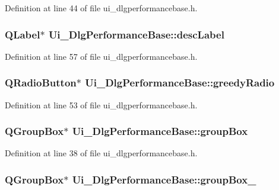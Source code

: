 Definition at line 44 of file ui\+\_\+dlgperformancebase.\+h.

\hypertarget{classUi__DlgPerformanceBase_a81970ae031653bae2f63fe1e5c390e59}{
\subsubsection[{desc\+Label}]{\setlength{\rightskip}{0pt plus 5cm}Q\+Label$\ast$ Ui\+\_\+\+Dlg\+Performance\+Base\+::desc\+Label}}\label{classUi__DlgPerformanceBase_a81970ae031653bae2f63fe1e5c390e59}


Definition at line 57 of file ui\+\_\+dlgperformancebase.\+h.

\hypertarget{classUi__DlgPerformanceBase_a211428e98a80beed21710b83d2c937c4}{
\subsubsection[{greedy\+Radio}]{\setlength{\rightskip}{0pt plus 5cm}Q\+Radio\+Button$\ast$ Ui\+\_\+\+Dlg\+Performance\+Base\+::greedy\+Radio}}\label{classUi__DlgPerformanceBase_a211428e98a80beed21710b83d2c937c4}


Definition at line 53 of file ui\+\_\+dlgperformancebase.\+h.

\hypertarget{classUi__DlgPerformanceBase_a95446d4eb7ed6bca1d9ab130459e2026}{
\subsubsection[{group\+Box}]{\setlength{\rightskip}{0pt plus 5cm}Q\+Group\+Box$\ast$ Ui\+\_\+\+Dlg\+Performance\+Base\+::group\+Box}}\label{classUi__DlgPerformanceBase_a95446d4eb7ed6bca1d9ab130459e2026}


Definition at line 38 of file ui\+\_\+dlgperformancebase.\+h.

\hypertarget{classUi__DlgPerformanceBase_a9c18db71e6b225bedfe650309a347b59}{
\subsubsection[{group\+Box\+\_\+2}]{\setlength{\rightskip}{0pt plus 5cm}Q\+Group\+Box$\ast$ Ui\+\_\+\+Dlg\+Performance\+Base\+::group\+Box\+\_}}\label{classUi__DlgPerformanceBase_a9c18db71e6b225bedfe650309a347b59}


